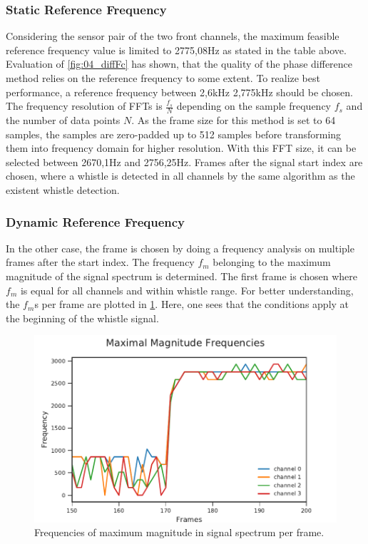 \subsubsection*{Static Reference Frequency}

Considering the sensor pair of the two front channels, the maximum feasible
reference frequency value is limited to 2775,08\si{\hertz} as stated in the table above.
Evaluation of \cref{fig:04_diffFc} has shown, that the quality of the phase difference
method relies on the reference frequency to some extent.
To realize best performance, a reference frequency between 2,6\si{\kilo\hertz} 2,775\si{\kilo\hertz}
should be chosen.
The frequency resolution of \acp{FFT} is $\frac{f_s}{N}$ depending on the sample frequency $f_s$ and
the number of data points $N$.
As the frame size for this method is set to 64 samples, the samples are zero-padded
up to 512 samples before transforming them into frequency domain for higher resolution.
With this \ac{FFT} size, it can be selected between 2670,1\si{\hertz}
and 2756,25\si{\hertz}.
Frames after the signal start index are chosen, where a whistle is detected
in all channels by the same algorithm as the existent whistle detection.

\subsubsection*{Dynamic Reference Frequency}

In the other case, the frame is chosen by doing a frequency analysis on
multiple frames after the start index.
The frequency $f_m$ belonging to the maximum magnitude of the signal spectrum
is determined.
The first frame is chosen where $f_m$ is equal for all channels and
within whistle range.
For better understanding, the $f_m$s per frame are plotted in \cref{fig:03_maxFreq}.
Here, one sees that the conditions apply at the beginning of the whistle signal.
\begin{figure}[ht]
	\centering
		\includegraphics[]{figures/maxFreq}
	\caption{Frequencies of maximum magnitude in signal spectrum per frame.}
    \label{fig:03_maxFreq}
\end{figure}
